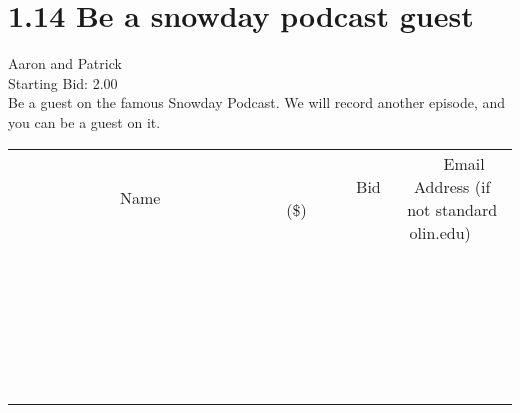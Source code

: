 \documentclass[11pt]{article}
\begin{document}
					\section*{1.14 Be a snowday podcast guest}
					Aaron and Patrick \\
					Starting Bid: 2.00 \\
					Be a guest on the famous Snowday Podcast. We will record another episode, and you can be a guest on it. \\
					[6ex]
					\begin{tabular}{c c c}
						~~~~~~~~~~~~~Name~~~~~~~~~~~~~ & ~~~~~~~~~Bid (\$)~~~~~~~~~ & ~~~Email Address (if not standard olin.edu)~~~ \\
				
 & & \\
\hline
 & & \\
\hline
 & & \\
\hline
 & & \\
\hline
 & & \\
\hline
 & & \\
\hline
 & & \\
\hline
 & & \\
\hline
 & & \\
\hline
 & & \\
\hline
 & & \\
\hline
 & & \\
\hline
 & & \\
\hline
 & & \\
\hline
 & & \\
\hline
 & & \\
\hline
 & & \\
\hline
 & & \\
\hline
 & & \\
\hline
 & & \\
\hline
 & & \\
\hline
 & & \\
\hline
 & & \\
\hline
 & & \\
\hline
 & & \\
\hline
 & & \\
\hline
					\end{tabular}
					\clearpage
				
\end{document}
